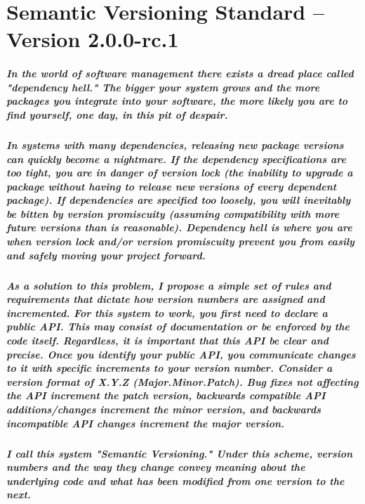 \chapter{Semantic Versioning Standard -- Version 2.0.0-rc.1}

\paragraph{
In the world of software management there exists a dread place called "dependency hell."
The bigger your system grows and the more packages you integrate into your software,
the more likely you are to find yourself, one day, in this pit of despair.
}

\paragraph{
In systems with many dependencies, releasing new package versions can quickly become a nightmare.
If the dependency specifications are too tight, you are in danger of version lock
(the inability to upgrade a package without having to release new versions of every
dependent package). If dependencies are specified too loosely, you will inevitably be
bitten by version promiscuity (assuming compatibility with more future versions than
  is reasonable). Dependency hell is where you are when version lock and/or version
promiscuity prevent you from easily and safely moving your project forward.
}

\paragraph{
As a solution to this problem, I propose a simple set of rules and requirements
that dictate how version numbers are assigned and incremented. For this system to
work, you first need to declare a public API. This may consist of documentation or
be enforced by the code itself. Regardless, it is important that this API be clear
and precise. Once you identify your public API, you communicate changes to it with
specific increments to your version number. Consider a version format of X.Y.Z (Major.Minor.Patch).
Bug fixes not affecting the API increment the patch version, backwards compatible API
additions/changes increment the minor version, and backwards incompatible API changes
increment the major version.
}

\paragraph{
I call this system "Semantic Versioning." Under this scheme, version numbers
and the way they change convey meaning about the underlying code and what has
been modified from one version to the next.
}

